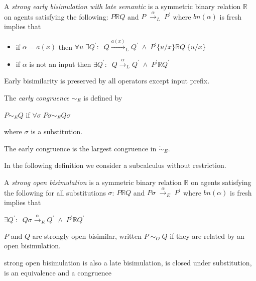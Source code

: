 \begin{definition}
  A \emph{strong early bisimulation with late semantic} is a symmetric binary relation $\mathbb{R}$ on agents satisfying the following: $P\mathbb{R} Q$ and $P\; \xrightarrow{\alpha}_{L}\; P^{'}$ where $bn(\alpha)$ is fresh implies that
  \begin{itemize}
    \item
      if $\alpha=a(x)$ then $\forall u\; \exists Q^{'}:\;\; Q\xrightarrow{a(x)}_{L}Q^{'}\; \wedge\; P^{'}\{u/x\}\mathbb{R}Q^{'}\{u/x\}$
    \item
      if $\alpha$ is not an input then $\exists Q^{'}:\;\; Q\xrightarrow{\alpha}_{L}Q^{'}\; \wedge\; P^{'}\mathbb{R}Q^{'}$
  \end{itemize}
\end{definition}

\begin{proposition}
  Early bisimilarity is preserved by all operators except input prefix. 
\end{proposition}


\begin{definition}
  The \emph{early congruence} $\sim_{E}$ is defined by
  \begin{center}
    $P\sim_{E} Q$ if $\forall \sigma\; P\sigma \dot{\sim}_{E} Q\sigma$
  \end{center}
  where $\sigma$ is a substitution.
\end{definition}

\begin{proposition}
  The early congruence is the largest congruence in $\dot{\sim}_{E}$.  
\end{proposition}

In the following definition we consider a subcalculus without restriction. 
\begin{definition}
  A \emph{strong open bisimulation} is a symmetric binary relation $\mathbb{R}$ on agents satisfying the following for all substitutions $\sigma$: $P\mathbb{R} Q$ and $P\sigma\; \xrightarrow{\alpha}_{E}\; P^{'}$ where $bn(\alpha)$ is fresh implies that
  \begin{center}
    $\exists Q^{'}:\;\; Q\sigma\xrightarrow{\alpha}_{E}Q^{'}\; \wedge\; P^{'}\mathbb{R}Q^{'}$
  \end{center}
  $P$ and $Q$ are strongly open bisimilar, written $P\; \dot{\sim}_{O}\; Q$ if they are related by an open bisimulation.
\end{definition}

\begin{proposition}
  strong open bisimulation is also a late bisimulation, is closed under substitution, is an equivalence and a congruence
\end{proposition}



